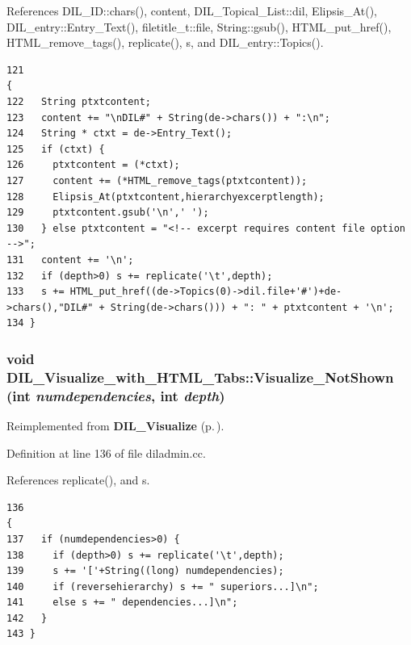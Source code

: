 References DIL\_\-ID::chars(), content, DIL\_\-Topical\_\-List::dil, Elipsis\_\-At(), DIL\_\-entry::Entry\_\-Text(), filetitle\_\-t::file, String::gsub(), HTML\_\-put\_\-href(), HTML\_\-remove\_\-tags(), replicate(), s, and DIL\_\-entry::Topics().



\footnotesize\begin{verbatim}121                                                                               {
122   String ptxtcontent;
123   content += "\nDIL#" + String(de->chars()) + ":\n";
124   String * ctxt = de->Entry_Text();
125   if (ctxt) {
126     ptxtcontent = (*ctxt);
127     content += (*HTML_remove_tags(ptxtcontent));
128     Elipsis_At(ptxtcontent,hierarchyexcerptlength);
129     ptxtcontent.gsub('\n',' ');
130   } else ptxtcontent = "<!-- excerpt requires content file option -->";
131   content += '\n';
132   if (depth>0) s += replicate('\t',depth);
133   s += HTML_put_href((de->Topics(0)->dil.file+'#')+de->chars(),"DIL#" + String(de->chars())) + ": " + ptxtcontent + '\n';
134 }
\end{verbatim}\normalsize 
{}
\subsubsection{\setlength{\rightskip}{0pt plus 5cm}void DIL\_\-Visualize\_\-with\_\-HTML\_\-Tabs::Visualize\_\-Not\-Shown (int {\em numdependencies}, int {\em depth})\hspace{0.3cm}{\tt  [virtual]}}\label{classDIL__Visualize__with__HTML__Tabs_a3}




Reimplemented from {\bf DIL\_\-Visualize} {\rm (p.\,\pageref{classDIL__Visualize_a6})}.

Definition at line 136 of file diladmin.cc.

References replicate(), and s.



\footnotesize\begin{verbatim}136                                                                                     {
137   if (numdependencies>0) {
138     if (depth>0) s += replicate('\t',depth);
139     s += '['+String((long) numdependencies);
140     if (reversehierarchy) s += " superiors...]\n";
141     else s += " dependencies...]\n";
142   }
143 }
\end{verbatim}\normalsize 


